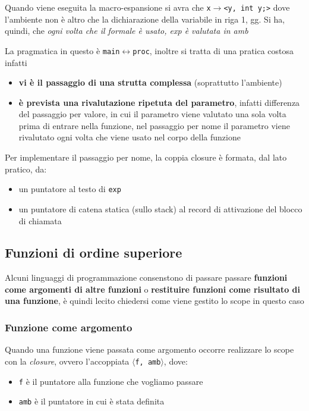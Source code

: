 Quando viene eseguita la macro-espansione si avra che \texttt{x$\to$<y, int y;>} dove l'ambiente non è altro che la dichiarazione della variabile in riga 1, gg. Si ha, quindi, che \textit{ogni volta che il formale è usato, exp è valutata in amb}

La pragmatica in questo è \texttt{main$\leftrightarrow$proc}, inoltre si tratta di una pratica costosa infatti

\begin{itemize}
    \item \textbf{vi è il passaggio di una strutta complessa} (soprattutto l'ambiente)
    \item \textbf{è prevista una rivalutazione ripetuta del parametro}, infatti differenza del passaggio per valore, in cui il parametro viene valutato una sola volta prima di entrare nella funzione, nel passaggio per nome il parametro viene rivalutato ogni volta che viene usato nel corpo della funzione
\end{itemize}

Per implementare il passaggio per nome, la coppia closure è formata, dal lato pratico, da:
\begin{itemize}
    \item un puntatore al testo di \texttt{exp}
    \item un puntatore di catena statica (sullo stack) al record di attivazione del blocco di chiamata
\end{itemize}
\subsection{Funzioni di ordine superiore}
Alcuni linguaggi di programmazione consenstono di passare passare \textbf{funzioni come argomenti di altre funzioni} o  \textbf{restituire funzioni come risultato di una funzione}, è quindi lecito chiedersi come viene gestito lo scope in questo caso

\subsubsection{Funzione come argomento}
Quando una funzione viene passata come argomento occorre realizzare lo scope con la \textit{closure}, ovvero l'accoppiata $\langle$\texttt{f, amb}$\rangle$, dove:
\begin{itemize}
    \item \texttt{f} è il puntatore alla funzione che vogliamo passare
    \item \texttt{amb} è il puntatore in cui è stata definita
\end{itemize}

